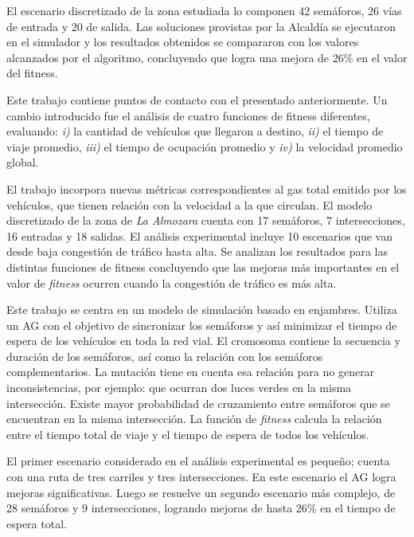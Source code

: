 \begin{itemize}
\begin{item}
El escenario discretizado de la zona estudiada lo componen 42 semáforos, 26 vías de entrada y 20 de salida. Las soluciones provistas por la Alcaldía se ejecutaron en el simulador y los resultados obtenidos se compararon con los valores alcanzados  por el algoritmo, concluyendo que logra una mejora de 26\% en el valor del fitness.

\end{item}

\begin{item}

Este trabajo contiene puntos de contacto con el presentado anteriormente. Un cambio introducido fue el análisis de cuatro funciones de fitness diferentes, evaluando: \textit{i)} la cantidad de vehículos que llegaron a destino, \textit{ii)} el tiempo de viaje promedio, \textit{iii)} el tiempo de ocupación promedio y \textit{iv)} la velocidad promedio global. 

El trabajo incorpora nuevas métricas correspondientes al gas total emitido por los vehículos, que tienen relación con la velocidad a la que circulan. El modelo discretizado de la zona de \emph{La Almozara} cuenta con 17 semáforos, 7 intersecciones, 16 entradas y 18 salidas. El análisis experimental incluye 10 escenarios que van desde baja congestión de tráfico hasta alta. Se analizan los resultados para las distintas funciones de fitness concluyendo que las mejoras más importantes en el valor de \emph{fitness} ocurren cuando la congestión de tráfico es más alta.

\end{item}


\begin{item}

Este trabajo se centra en un modelo de simulación basado en enjambres. Utiliza un AG con el objetivo de sincronizar los semáforos y así minimizar el tiempo de espera de los vehículos en toda la red vial. El cromosoma contiene la secuencia y duración de los semáforos, así como la relación con los semáforos complementarios. La mutación tiene en cuenta esa relación para no generar inconsistencias, por ejemplo: que ocurran dos luces verdes en la misma intersección. Existe mayor probabilidad de cruzamiento entre semáforos que se encuentran en la misma intersección. La función de \emph{fitness} calcula la relación entre el tiempo total de viaje y el tiempo de espera de todos los vehículos. 

El primer escenario considerado en el análisis experimental es pequeño; cuenta con una ruta de tres carriles y tres intersecciones. En este escenario el AG logra mejoras significativas. Luego se resuelve un segundo escenario más complejo, de 28 semáforos y 9 intersecciones, logrando mejoras de hasta 26\% en el tiempo de espera total.
\end{item}	



\end{itemize}
